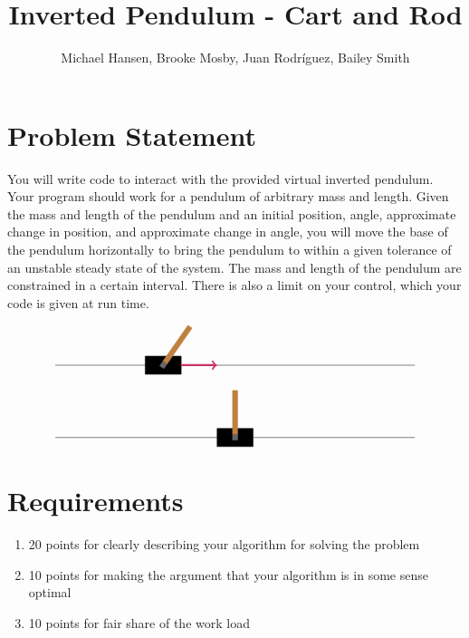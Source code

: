 \documentclass{hitec}
\author{Michael Hansen, Brooke Mosby, Juan Rodr\'iguez, Bailey Smith}
\title{Inverted Pendulum - Cart and Rod}
\begin{document}
	\maketitle
	
	\section{Problem Statement}
	You will write code to interact with the provided virtual inverted pendulum. Your
	program should work for a pendulum of arbitrary mass and length. Given the mass and
	length of the pendulum and an initial position, angle, approximate change in position, and
	approximate change in angle, you will move the base of the pendulum horizontally to bring
	the pendulum to within a given tolerance of an unstable steady state of the system. The
	mass and length of the pendulum are constrained in a certain interval. There is also a limit
	on your control, which your code is given at run time.
	
	\[
	\begin{tikzpicture}
	
	\draw[help lines,thick] (-5,0) -- (5,0);
	\filldraw[black] (-2.5,-.25) -- ++(0,.5) -- ++(1,0) -- ++(0,-.5) -- cycle;
	\begin{scope}[xshift=-2cm,rotate=-35]
	\filldraw[black!60] (-.07,-.07) -- ++(0,.17) -- ++(.14,0) -- ++(0,-.17) -- cycle;
	\filldraw[brown] (-.07,.1) -- ++(0,1.2) -- ++(.14,0) -- ++(0,-1.2) -- cycle;
	\end{scope}
	\draw[ultra thick,->,purple!80] (-1.5,0) -- ++(1,0);
	
	\begin{scope}[yshift=-2cm]
	\draw[help lines,thick] (-5,0) -- (5,0);
	\filldraw[black] (-.5,-.25) -- ++(0,.5) -- ++(1,0) -- ++(0,-.5) -- cycle;
	\filldraw[black!60] (-.07,-.07) -- ++(0,.17) -- ++(.14,0) -- ++(0,-.17) -- cycle;
	\filldraw[brown] (-.07,.1) -- ++(0,1.2) -- ++(.14,0) -- ++(0,-1.2) -- cycle;
	
	\end{scope}
	\end{tikzpicture}
	\]
	
	
	\section{Requirements}
	\begin{enumerate}
		\item 20 points for clearly describing your algorithm for solving the problem
		\item 10 points for making the argument that your algorithm is in some sense optimal
		\item 10 points for fair share of the
		work load
	\end{enumerate}
	
\end{document}
